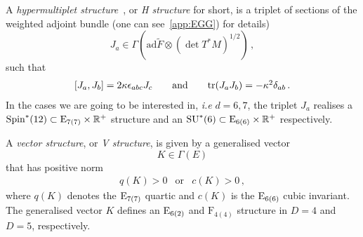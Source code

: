\documentclass[debug]{phd}
\begin{document}
					A \emph{hypermultiplet structure}~\cite{AshmoreECY}, or \emph{H structure} for short, is a triplet of sections of the weighted adjoint bundle (one can see~\cref{app:EGG}) for details) 
							\begin{equation}
								J_a \in \Gamma (\mathrm{ad} \tilde{F} \otimes (\det T^*M)^{1/2})\, , 
							\end{equation}
					such that
							\begin{equation}
								\begin{array}{ccccc}
									\com{J_a}{J_{b}} = 2 \kappa \epsilon_{abc} J_{c}& & \mbox{and} & & \tr \left( J_{a} J_{b}\right) = - \kappa^2 \delta_{ab}\, .
								\end{array}
							\end{equation}
					In the cases we are going to be interested in, \emph{i.e} $d = 6, 7$, the triplet $J_{a}$ realises a $\mathrm{Spin}^*(12) \subset \mathrm{E}_{7(7)} \times \mathbb{R}^+$ structure and an $\mathrm{SU}^*(6) \subset \mathrm{E}_{6(6)} \times \mathbb{R}^+$ respectively.
	
					A \emph{vector structure}, or \emph{V structure}, is given by a generalised vector
							\begin{equation} 
								K \in \Gamma \left( E\right) 
							\end{equation}
					that has positive norm 
							\begin{equation}
								\begin{array}{ccc}
									q(K) >0 & \mbox{or} & c(K)>0\, , 
								\end{array}
							\end{equation}
					where $q(K)$ denotes the $\mathrm{E}_{7(7)}$ quartic and $c(K)$ is the $\mathrm{E}_{6(6)}$ cubic invariant. 
					The generalised vector $K$ defines an $\mathrm{E}_{6(2)}$ and $\mathrm{F}_{4(4)}$ structure in $D=4$ and $D=5$, respectively.
\end{document}
